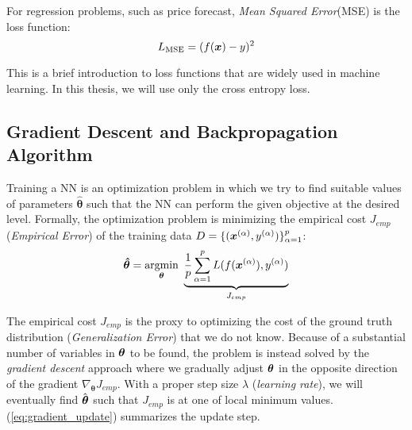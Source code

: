 

For regression problems, such as price forecast, \textit{Mean Squared Error}(MSE) is the loss function:
$$
L_{\text{MSE}} = (f(\boldsymbol{x}) - y)^2
$$

This is a brief introduction to loss functions that are widely used in machine learning. In this thesis, we will use only the cross entropy loss.

\subsection{Gradient Descent and Backpropagation Algorithm} 
Training a NN is an optimization problem in which we try to find suitable values of parameters $\hat{\boldsymbol{\theta}}$ such that the NN can perform the given objective at the desired level. Formally, the optimization problem is minimizing the empirical cost $J_{emp}$ (\textit{Empirical Error}) of the training data $D=\{ (\xa, \ya) \}_{\alpha=1}^{p}$:
\begin{align} \label{eq:nn_opt}
	\patvector{\hat{\theta}} = \patarg{min}{\boldsymbol{\theta}} \underbrace{\frac{1}{p}  \sum_{\alpha=1}^p L( f(\xa), \ya) }_{J_{emp}}
\end{align}

The empirical cost $J_{emp}$ is the proxy to optimizing the cost of the ground truth distribution (\textit{Generalization Error}) that we do not know. Because of a substantial number of  variables in $\patvector{\theta}$ to be found,  the problem is instead solved by the \textit{gradient descent} approach where we gradually adjust $\patvector{\theta}$ in the opposite direction of the gradient $\nabla_{\boldsymbol{\theta}} J_{emp}$. With a proper step size $\lambda$  (\textit{learning rate}), we will eventually find $\hat{\patvector{\theta}}$ such that $J_{emp}$ is at one of local minimum values. (\ref{eq:gradient_update}) summarizes the update step.


%
%
%

